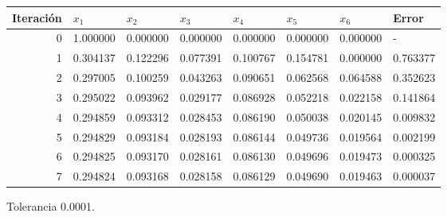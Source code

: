 \begin{table}[h]
    \centering
    \begin{tabular}{r|llllll|l}
        Iteración & $x_1$ &    $x_2$  &     $x_3$  &     $x_4$  &     $x_5$  &     $x_6$  &     Error \\
        \hline
         0  &  1.000000  &  0.000000  &  0.000000  &  0.000000  &  0.000000  &  0.000000  &  -        \\
         1  &  0.304137  &  0.122296  &  0.077391  &  0.100767  &  0.154781  &  0.000000  &  0.763377 \\
         2  &  0.297005  &  0.100259  &  0.043263  &  0.090651  &  0.062568  &  0.064588  &  0.352623 \\
         3  &  0.295022  &  0.093962  &  0.029177  &  0.086928  &  0.052218  &  0.022158  &  0.141864 \\
         4  &  0.294859  &  0.093312  &  0.028453  &  0.086190  &  0.050038  &  0.020145  &  0.009832 \\
         5  &  0.294829  &  0.093184  &  0.028193  &  0.086144  &  0.049736  &  0.019564  &  0.002199 \\
         6  &  0.294825  &  0.093170  &  0.028161  &  0.086130  &  0.049696  &  0.019473  &  0.000325 \\
         7  &  0.294824  &  0.093168  &  0.028158  &  0.086129  &  0.049690  &  0.019463  &  0.000037
    \end{tabular}
\end{table}


Tolerancia 0.0001.

